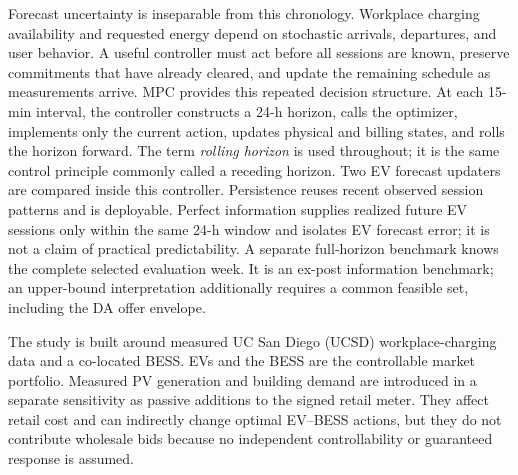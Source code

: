 \documentclass[final,5p,times]{elsarticle}
\begin{document}
Forecast uncertainty is inseparable from this chronology. Workplace charging availability and requested energy depend on stochastic arrivals, departures, and user behavior. A useful controller must act before all sessions are known, preserve commitments that have already cleared, and update the remaining schedule as measurements arrive. MPC provides this repeated decision structure. At each 15-min interval, the controller constructs a 24-h horizon, calls the optimizer, implements only the current action, updates physical and billing states, and rolls the horizon forward. The term \emph{rolling horizon} is used throughout; it is the same control principle commonly called a receding horizon. Two EV forecast updaters are compared inside this controller. Persistence reuses recent observed session patterns and is deployable. Perfect information supplies realized future EV sessions only within the same 24-h window and isolates EV forecast error; it is not a claim of practical predictability. A separate full-horizon benchmark knows the complete selected evaluation week. It is an ex-post information benchmark; an upper-bound interpretation additionally requires a common feasible set, including the DA offer envelope.

The study is built around measured UC San Diego (UCSD) workplace-charging data and a co-located BESS. EVs and the BESS are the controllable market portfolio. Measured PV generation and building demand are introduced in a separate sensitivity as passive additions to the signed retail meter. They affect retail cost and can indirectly change optimal EV--BESS actions, but they do not contribute wholesale bids because no independent controllability or guaranteed response is assumed.
\end{document}
